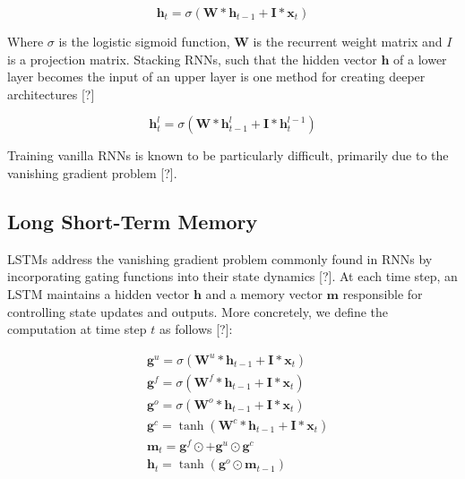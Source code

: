 \documentclass{article}
\begin{document}
\begin{equation}
	\boldsymbol h_t = \sigma(\boldsymbol W * \boldsymbol h_{t-1} + \boldsymbol I * \boldsymbol x_t) \nonumber
\end{equation}

Where $\sigma$ is the logistic sigmoid function, $\boldsymbol W$ is the recurrent weight matrix and $I$ is a projection matrix. Stacking RNNs, such that the hidden vector $\boldsymbol h$ of a lower layer becomes the input of an upper layer is one method for creating deeper architectures [?]

\begin{equation}
	\boldsymbol h_t^{l} = \sigma(\boldsymbol W * \boldsymbol h_{t-1}^{l} + \boldsymbol I * \boldsymbol h_t^{l-1}) \nonumber
\end{equation}

Training vanilla RNNs is known to be particularly difficult, primarily due to the vanishing gradient problem [?].

\subsection{Long Short-Term Memory}
LSTMs address the vanishing gradient problem commonly found in RNNs by incorporating gating functions into their state dynamics [?]. At each time step, an LSTM maintains a hidden vector $\boldsymbol h$ and a memory vector $\boldsymbol m$  responsible for controlling state updates and outputs. More concretely, we define the computation at time step $t$ as follows [?]:

\begin{equation}
	\begin{split}
		& \boldsymbol g^u = \sigma(\boldsymbol W^u * \boldsymbol h_{t-1} + \boldsymbol I * \boldsymbol x_t) \\
		& \boldsymbol g^f = \sigma(\boldsymbol W^f * \boldsymbol h_{t-1} + \boldsymbol I * \boldsymbol x_t) \\
		& \boldsymbol g^o = \sigma(\boldsymbol W^o * \boldsymbol h_{t-1} + \boldsymbol I * \boldsymbol x_t) \\
		& \boldsymbol g^c = \tanh(\boldsymbol W^c * \boldsymbol h_{t-1} + \boldsymbol I * \boldsymbol x_t) \\
		& \boldsymbol m_t = \boldsymbol g^f \odot \boldsymbol +  \boldsymbol g^u \odot \boldsymbol g^c \\
		& \boldsymbol h_t = \tanh(\boldsymbol g^o \odot \boldsymbol m_{t-1}) \nonumber
	\end{split}
\end{equation}
\end{document}
